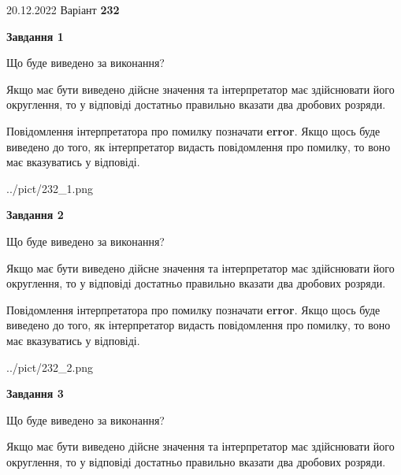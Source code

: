 \documentclass[12pt, ukrainian]{article}
\begin{document}
{20.12.2022 Варіант \No \textbf { 232 }\par}
{
\begin {Large}

{\begin {center}\textbf{Завдання 1}\end {center}}\par
Що буде виведено за виконання? \par

Якщо має бути виведено дійсне значення та інтерпретатор має здійснювати його округлення, 
то у відповіді достатньо правильно вказати два дробових розряди.

Повідомлення інтерпретатора про помилку позначати \textbf{error}.
Якщо щось буде виведено до того, як інтерпретатор видасть повідомлення про помилку, 
то воно має вказуватись у відповіді. \par

\begin{center}
	{../pict/232_1.png}
\end{center}
\newpage

{\begin {center}\textbf{Завдання 2}\end {center}}\par
Що буде виведено за виконання? \par

Якщо має бути виведено дійсне значення та інтерпретатор має здійснювати його округлення, 
то у відповіді достатньо правильно вказати два дробових розряди.

Повідомлення інтерпретатора про помилку позначати \textbf{error}.
Якщо щось буде виведено до того, як інтерпретатор видасть повідомлення про помилку, 
то воно має вказуватись у відповіді. \par

\begin{center}
	{../pict/232_2.png}
\end{center}
\newpage

{\begin {center}\textbf{Завдання 3}\end {center}}\par
Що буде виведено за виконання? \par

Якщо має бути виведено дійсне значення та інтерпретатор має здійснювати його округлення, 
то у відповіді достатньо правильно вказати два дробових розряди.


\end{Large}}
\end{document}
